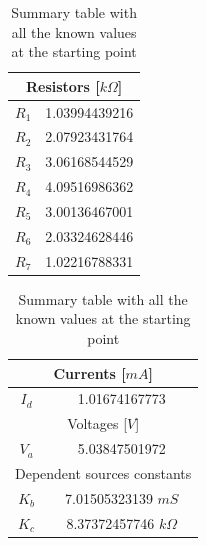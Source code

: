 \begin{table}[H]
    \begin{minipage}{.5\textwidth}
      \centering
      \begin{tabular}{c|c}
        \hline
        \multicolumn{2}{c}{Resistors [$k\Omega$]}  \\
        \hline
        $R_1$ & 1.03994439216 \\
        $R_2$ & 2.07923431764 \\
        $R_3$ & 3.06168544529 \\
        $R_4$ & 4.09516986362 \\
        $R_5$ & 3.00136467001 \\
        $R_6$ & 2.03324628446 \\
        $R_7$ & 1.02216788331
      \end{tabular}
    \end{minipage}
    \begin{minipage}{.5\textwidth}
      \centering
      \begin{tabular}{c|c}
        \hline
        \multicolumn{2}{c}{Currents [$mA$]}  \\
        \hline
        $I_d$ & 1.01674167773 \\
        \hline
        \hline
        \multicolumn{2}{c}{Voltages [$V$]}  \\
        \hline
        $V_a$ & 5.03847501972 \\
        \hline
        \hline
        \multicolumn{2}{c}{Dependent sources constants}  \\
        \hline
        $K_b$ & 7.01505323139 $mS$ \\
        $K_c$ & 8.37372457746 $k\Omega$
      \end{tabular}
    \end{minipage}
    \caption{Summary table with all the known values at the starting point}
    \label{tab:initial_values}
\end{table}
